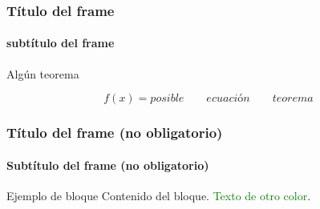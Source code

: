\documentclass[spanish,xcolor=dvipsnames]{beamer}
\begin{document}
    \begin{frame}
        \frametitle{Título del frame}
        \framesubtitle{subtítulo del frame}
        \begin{theorem}
        	Algún teorema
        	
        	\begin{equation}
        		f(x) = posible\qquad ecuación \qquad teorema
        	\end{equation}
        	
        \end{theorem}
    \end{frame}
    
    \begin{frame}
        \frametitle{Título del frame (no obligatorio)}
        \framesubtitle{Subtítulo del frame (no obligatorio)}
        \begin{block}{Ejemplo de bloque}
        	Contenido del bloque. \textcolor{green}{Texto de otro color}.
        \end{block}
    \end{frame}
    
        
    
\end{document}
